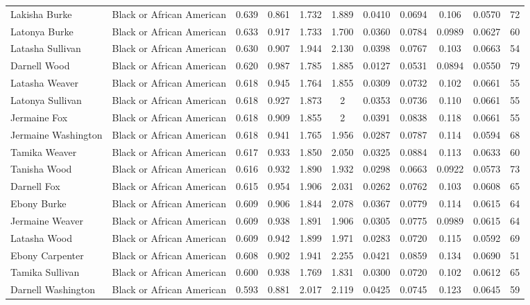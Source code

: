 \documentclass[]{article}
\begin{document}
\begin{tabular}{lcccccccccc}
Lakisha Burke & Black or African American & 0.639 & 0.861 & 1.732 & 1.889 & 0.0410 & 0.0694 & 0.106 & 0.0570 & 72 \\
Latonya Burke & Black or African American & 0.633 & 0.917 & 1.733 & 1.700 & 0.0360 & 0.0784 & 0.0989 & 0.0627 & 60 \\
Latasha Sullivan & Black or African American & 0.630 & 0.907 & 1.944 & 2.130 & 0.0398 & 0.0767 & 0.103 & 0.0663 & 54 \\
Darnell Wood & Black or African American & 0.620 & 0.987 & 1.785 & 1.885 & 0.0127 & 0.0531 & 0.0894 & 0.0550 & 79 \\
Latasha Weaver & Black or African American & 0.618 & 0.945 & 1.764 & 1.855 & 0.0309 & 0.0732 & 0.102 & 0.0661 & 55 \\
Latonya Sullivan & Black or African American & 0.618 & 0.927 & 1.873 & 2 & 0.0353 & 0.0736 & 0.110 & 0.0661 & 55 \\
Jermaine Fox & Black or African American & 0.618 & 0.909 & 1.855 & 2 & 0.0391 & 0.0838 & 0.118 & 0.0661 & 55 \\
Jermaine Washington & Black or African American & 0.618 & 0.941 & 1.765 & 1.956 & 0.0287 & 0.0787 & 0.114 & 0.0594 & 68 \\
Tamika Weaver & Black or African American & 0.617 & 0.933 & 1.850 & 2.050 & 0.0325 & 0.0884 & 0.113 & 0.0633 & 60 \\
Tanisha Wood & Black or African American & 0.616 & 0.932 & 1.890 & 1.932 & 0.0298 & 0.0663 & 0.0922 & 0.0573 & 73 \\
Darnell Fox & Black or African American & 0.615 & 0.954 & 1.906 & 2.031 & 0.0262 & 0.0762 & 0.103 & 0.0608 & 65 \\
Ebony Burke & Black or African American & 0.609 & 0.906 & 1.844 & 2.078 & 0.0367 & 0.0779 & 0.114 & 0.0615 & 64 \\
Jermaine Weaver & Black or African American & 0.609 & 0.938 & 1.891 & 1.906 & 0.0305 & 0.0775 & 0.0989 & 0.0615 & 64 \\
Latasha Wood & Black or African American & 0.609 & 0.942 & 1.899 & 1.971 & 0.0283 & 0.0720 & 0.115 & 0.0592 & 69 \\
Ebony Carpenter & Black or African American & 0.608 & 0.902 & 1.941 & 2.255 & 0.0421 & 0.0859 & 0.134 & 0.0690 & 51 \\
Tamika Sullivan & Black or African American & 0.600 & 0.938 & 1.769 & 1.831 & 0.0300 & 0.0720 & 0.102 & 0.0612 & 65 \\
Darnell Washington & Black or African American & 0.593 & 0.881 & 2.017 & 2.119 & 0.0425 & 0.0745 & 0.123 & 0.0645 & 59 \\

\end{tabular}
\end{document}
